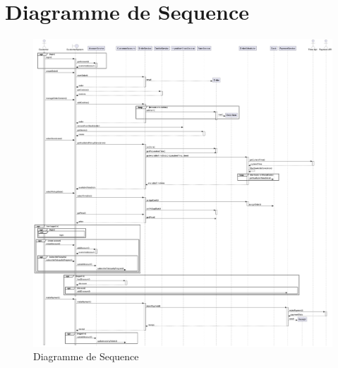 \pagebreak
\newpage
\section{Diagramme de Sequence}


\begin{figure}[!ht]
\includegraphics[width=1\textwidth]{place-order}
\centering
\caption{Diagramme de Sequence}
\label{uml:place-order}
\end{figure}
